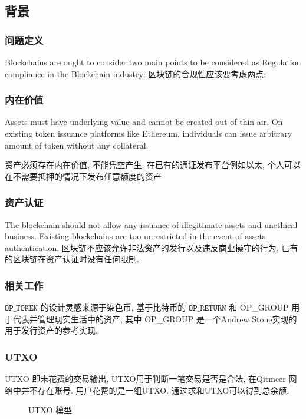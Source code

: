 \documentclass[a4paper,11pt]{article}
\begin{document}
\subsection{背景}
\subsubsection{问题定义}

Blockchains are ought to consider two main points to be considered as Regulation compliance in the Blockchain industry:
区块链的合规性应该要考虑两点:

\subsubsection*{内在价值}
Assets must have underlying value and cannot be created out of thin air. On existing token issuance platforms like Ethereum\cite{Ethereum}, individuals can issue arbitrary amount of token without any collateral.

资产必须存在内在价值, 不能凭空产生. 在已有的通证发布平台例如以太\cite{Ethereum}, 个人可以在不需要抵押的情况下发布任意额度的资产
 

\subsubsection*{资产认证}
The blockchain should not allow any issuance of illegitimate assets and unethical business. Existing blockchains are too unrestricted in the event of assets authentication.
区块链不应该允许非法资产的发行以及违反商业操守的行为, 已有的区块链在资产认证时没有任何限制. 

\subsubsection{相关工作}

$\texttt{OP\_TOKEN}$ 的设计灵感来源于染色币, 基于比特币的 $\texttt{OP\_RETURN}$ 和  OP\_GROUP  用于代表并管理现实生活中的资产, 其中 OP\_GROUP 是一个Andrew Stone实现的用于发行资产的参考实现, 

\subsubsection*{UTXO}

UTXO 即未花费的交易输出, UTXO用于判断一笔交易是否是合法, 在Qitmeer 网络中并不存在账号. 用户花费的是一组UTXO. 通过求和UTXO可以得到总余额.

\begin{figure}[hbt]
	\centerline{%
	}
\caption{UTXO 模型}
\end{figure}
\end{document}
